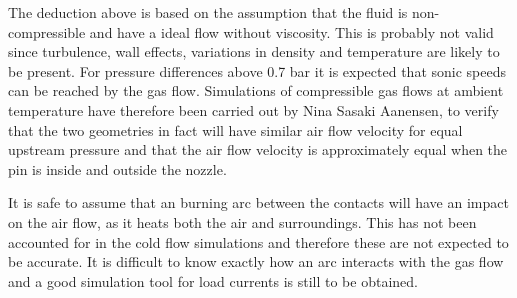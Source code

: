 \documentclass[10pt,a4paper]{article} %
\begin{document}
The deduction above is based on the assumption that the fluid is non-compressible and have a ideal flow without viscosity. This is probably not valid since turbulence, wall effects, variations in density and temperature are likely to be present. For pressure differences above 0.7 bar it is expected that sonic speeds can be reached by the gas flow. Simulations of compressible gas flows at ambient temperature have therefore been carried out by Nina Sasaki Aanensen, to verify that the two geometries in fact will have similar air flow velocity for equal upstream pressure and that the air flow velocity is approximately equal when the pin is inside and outside the nozzle. 

It is safe to assume that an burning arc between the contacts will have an impact on the air flow, as it heats both the air and surroundings. This has not been accounted for in the cold flow simulations and therefore these are not expected to be accurate. It is difficult to know exactly how an arc interacts with the gas flow and a good simulation tool for load currents is still to be obtained.


\end{document}

